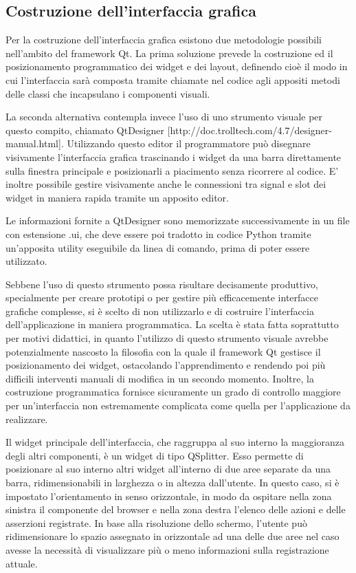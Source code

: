 \documentclass[12pt]{toptesi}
\begin{document}
\subsection{Costruzione dell'interfaccia grafica}

Per la costruzione dell'interfaccia grafica esistono due metodologie possibili nell'ambito del framework Qt. La prima soluzione prevede la costruzione ed il posizionamento programmatico dei widget e dei layout, definendo cioè il modo in cui l'interfaccia sarà composta tramite chiamate nel codice agli appositi metodi delle classi che incapsulano i componenti visuali.

La seconda alternativa contempla invece l'uso di uno strumento visuale per questo compito, chiamato QtDesigner [http://doc.trolltech.com/4.7/designer-manual.html]. Utilizzando questo editor il programmatore può disegnare visivamente l'interfaccia grafica trascinando i widget da una barra direttamente sulla finestra principale e posizionarli a piacimento senza ricorrere al codice. E' inoltre possibile gestire visivamente anche le connessioni tra signal e slot dei widget in maniera rapida tramite un apposito editor. 

Le informazioni fornite a QtDesigner sono memorizzate successivamente in un file con estensione .ui, che deve essere poi tradotto in codice Python tramite un'apposita utility eseguibile da linea di comando, prima di poter essere utilizzato.

Sebbene l'uso di questo strumento possa risultare decisamente produttivo, specialmente per creare prototipi o per gestire più efficacemente interfacce grafiche complesse, si è scelto di non utilizzarlo e di costruire l'interfaccia dell'applicazione in maniera programmatica. La scelta è stata fatta soprattutto per motivi didattici, in quanto l'utilizzo di questo strumento visuale avrebbe potenzialmente nascosto la filosofia con la quale il framework Qt gestisce il posizionamento dei widget, ostacolando l'apprendimento e rendendo poi più difficili interventi manuali di modifica in un secondo momento. Inoltre, la costruzione programmatica fornisce sicuramente un grado di controllo maggiore per un'interfaccia non estremamente complicata come quella per l'applicazione da realizzare.

Il widget principale dell'interfaccia, che raggruppa al suo interno la maggioranza degli altri componenti, è un widget di tipo QSplitter. Esso permette di posizionare al suo interno altri widget all'interno di due aree separate da una barra, ridimensionabili in larghezza o in altezza dall'utente. In questo caso, si è impostato l'orientamento in senso orizzontale, in modo da ospitare nella zona sinistra il componente del browser e nella zona destra l'elenco delle azioni e delle asserzioni registrate. In base alla risoluzione dello schermo, l'utente può ridimensionare lo spazio assegnato in orizzontale ad una delle due aree nel caso avesse la necessità di visualizzare più o meno informazioni sulla registrazione attuale.
\end{document}
